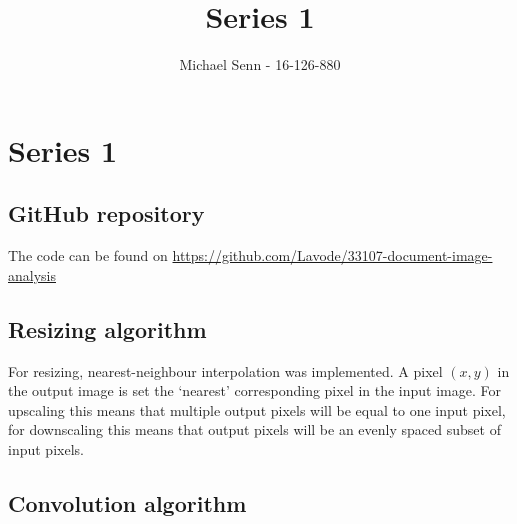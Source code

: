 \documentclass[a4paper]{scrreprt}
\title{Series 1}
\author{Michael Senn \maillink{michael.senn@students.unibe.ch} - 16-126-880}
\date{\printdate}
\DeclarePairedDelimiter\floor{\lfloor}{\rfloor}
\newcommand{\var}[1]{\textit{#1}}
\begin{document}
\maketitle


\setcounter{chapter}{0}

\chapter{Series 1}

\section{GitHub repository}

The code can be found on \url{https://github.com/Lavode/33107-document-image-analysis}

\section{Resizing algorithm}

For resizing, nearest-neighbour interpolation was implemented. A pixel $(x, y)$
in the output image is set the `nearest' corresponding pixel in the input
image.  For upscaling this means that multiple output pixels will be equal to
one input pixel, for downscaling this means that output pixels will be an
evenly spaced subset of input pixels.


\section{Convolution algorithm}
\end{document}
